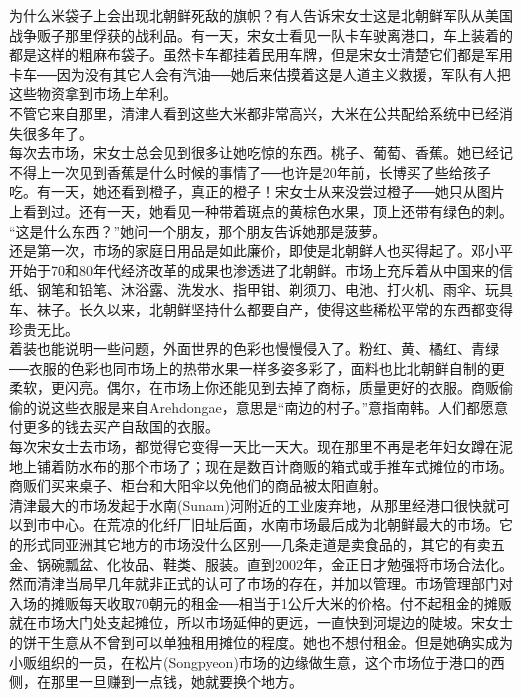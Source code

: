 为什么米袋子上会出现北朝鲜死敌的旗帜？有人告诉宋女士这是北朝鲜军队从美国战争贩子那里俘获的战利品。有一天，宋女士看见一队卡车驶离港口，车上装着的都是这样的粗麻布袋子。虽然卡车都挂着民用车牌，但是宋女士清楚它们都是军用卡车──因为没有其它人会有汽油──她后来估摸着这是人道主义救援，军队有人把这些物资拿到市场上牟利。\\

不管它来自那里，清津人看到这些大米都非常高兴，大米在公共配给系统中已经消失很多年了。\\

每次去市场，宋女士总会见到很多让她吃惊的东西。桃子、葡萄、香蕉。她已经记不得上一次见到香蕉是什么时候的事情了──也许是20年前，长博买了些给孩子吃。有一天，她还看到橙子，真正的橙子！宋女士从来没尝过橙子──她只从图片上看到过。还有一天，她看见一种带着斑点的黄棕色水果，顶上还带有绿色的刺。\\

“这是什么东西？”她问一个朋友，那个朋友告诉她那是菠萝。\\

还是第一次，市场的家庭日用品是如此廉价，即使是北朝鲜人也买得起了。邓小平开始于70和80年代经济改革的成果也渗透进了北朝鲜。市场上充斥着从中国来的信纸、钢笔和铅笔、沐浴露、洗发水、指甲钳、剃须刀、电池、打火机、雨伞、玩具车、袜子。长久以来，北朝鲜坚持什么都要自产，使得这些稀松平常的东西都变得珍贵无比。\\

着装也能说明一些问题，外面世界的色彩也慢慢侵入了。粉红、黄、橘红、青绿──衣服的色彩也同市场上的热带水果一样多姿多彩了，面料也比北朝鲜自制的更柔软，更闪亮。偶尔，在市场上你还能见到去掉了商标，质量更好的衣服。商贩偷偷的说这些衣服是来自Arehdongae，意思是“南边的村子。”意指南韩。人们都愿意付更多的钱去买产自敌国的衣服。\\

每次宋女士去市场，都觉得它变得一天比一天大。现在那里不再是老年妇女蹲在泥地上铺着防水布的那个市场了；现在是数百计商贩的箱式或手推车式摊位的市场。商贩们买来桌子、柜台和大阳伞以免他们的商品被太阳直射。\\

清津最大的市场发起于水南(Sunam)河附近的工业废弃地，从那里经港口很快就可以到市中心。在荒凉的化纤厂旧址后面，水南市场最后成为北朝鲜最大的市场。它的形式同亚洲其它地方的市场没什么区别──几条走道是卖食品的，其它的有卖五金、锅碗瓢盆、化妆品、鞋类、服装。直到2002年，金正日才勉强将市场合法化。然而清津当局早几年就非正式的认可了市场的存在，并加以管理。市场管理部门对入场的摊贩每天收取70朝元的租金──相当于1公斤大米的价格。付不起租金的摊贩就在市场大门处支起摊位，所以市场延伸的更远，一直快到河堤边的陡坡。宋女士的饼干生意从不曾到可以单独租用摊位的程度。她也不想付租金。但是她确实成为小贩组织的一员，在松片(Songpyeon)市场的边缘做生意，这个市场位于港口的西侧，在那里一旦赚到一点钱，她就要换个地方。\\


